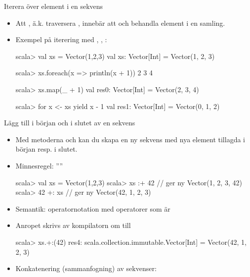 \begin{Slide}{Iterera över element i en sekvens}
\begin{itemize}
\item Att  , ä.k. traversera , innebär att  och behandla element i en samling. 
\item Exempel på iterering med , , :
\begin{REPLnonum}
scala> val xs = Vector(1,2,3)
val xs: Vector[Int] = Vector(1, 2, 3)

scala> xs.foreach(x => println(x + 1)) 
2
3
4

scala> xs.map(_ + 1)
val res0: Vector[Int] = Vector(2, 3, 4)

scala> for x <- xs yield x - 1
val res1: Vector[Int] = Vector(0, 1, 2)

\end{REPLnonum}
\end{itemize}
\end{Slide}

\begin{Slide}{Lägg till i början och i slutet av en sekvens}
  \begin{itemize}
  \item Med metoderna \code{+:} och \code{:+} kan du skapa en ny sekvens med nya element tillagda i början resp. i slutet.
  \item Minnesregel: ''''
  \begin{REPLnonum}
  scala> val xs = Vector(1,2,3)
  scala> xs :+ 42         // ger ny Vector(1, 2, 3, 42)
  scala> 42 +: xs         // ger ny Vector(42, 1, 2, 3)
  \end{REPLnonum}
  \pause
  \item Semantik: operatornotation med operatorer som  är 
  \item Anropet  skrivs av kompilatorn om till 
  \begin{REPL}
  scala> xs.+:(42)
  res4: scala.collection.immutable.Vector[Int] = Vector(42, 1, 2, 3)
  \end{REPL}
  \pause
  \item Konkatenering (sammanfogning) av sekvenser: 
  
  \end{itemize}
\end{Slide}


